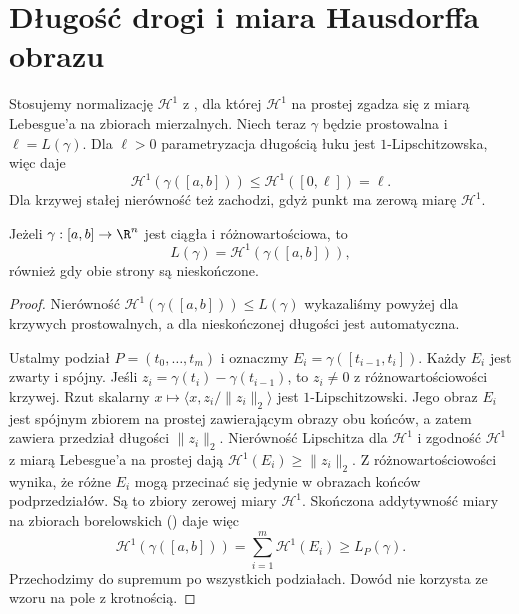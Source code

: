 \section{Długość drogi i miara Hausdorffa obrazu}

Stosujemy normalizację $\mathcal H^1$ z
,
dla której $\mathcal H^1$ na prostej zgadza się
z miarą Lebesgue'a na zbiorach mierzalnych.
Niech teraz $\gamma$ będzie prostowalna i $\ell=L(\gamma)$.
Dla $\ell>0$ parametryzacja długością łuku jest
$1$-Lipschitzowska, więc
daje
\[
 \mathcal H^1(\gamma([a,b]))\le
 \mathcal H^1([0,\ell])=\ell.
\]
Dla krzywej stałej nierówność też zachodzi,
gdyż punkt ma zerową miarę $\mathcal H^1$.

\begin{stwierdzenie}
\label{ma2:prop:simple-curve-hausdorff}
Jeżeli $\gamma:[a,b]\to\R^n$ jest ciągła
i różnowartościowa, to
\[
 L(\gamma)=\mathcal H^1(\gamma([a,b])),
\]
również gdy obie strony są nieskończone.
\end{stwierdzenie}
\begin{proof}
Nierówność $\mathcal H^1(\gamma([a,b]))\le L(\gamma)$
wykazaliśmy powyżej dla krzywych prostowalnych,
a dla nieskończonej długości jest automatyczna.

Ustalmy podział $P=(t_0,\ldots,t_m)$ i oznaczmy
$E_i=\gamma([t_{i-1},t_i])$.
Każdy $E_i$ jest zwarty i spójny. Jeśli
$z_i=\gamma(t_i)-\gamma(t_{i-1})$, to $z_i\ne0$
z różnowartościowości krzywej.
Rzut skalarny $x\mapsto\langle x,z_i/\|z_i\|_2\rangle$
jest $1$-Lipschitzowski. Jego obraz $E_i$ jest
spójnym zbiorem na prostej zawierającym obrazy obu
końców, a zatem zawiera przedział długości
$\|z_i\|_2$. Nierówność Lipschitza dla $\mathcal H^1$
i zgodność $\mathcal H^1$ z miarą Lebesgue'a na
prostej dają $\mathcal H^1(E_i)\ge\|z_i\|_2$.
Z różnowartościowości wynika, że różne $E_i$
mogą przecinać się jedynie w obrazach końców
podprzedziałów. Są to zbiory zerowej miary
$\mathcal H^1$. Skończona addytywność miary
na zbiorach borelowskich
()
daje więc
\[
 \mathcal H^1(\gamma([a,b]))
 =\sum_{i=1}^m\mathcal H^1(E_i)
 \ge L_P(\gamma).
\]
Przechodzimy do supremum po wszystkich podziałach.
Dowód nie korzysta ze wzoru na pole z krotnością.
\end{proof}


